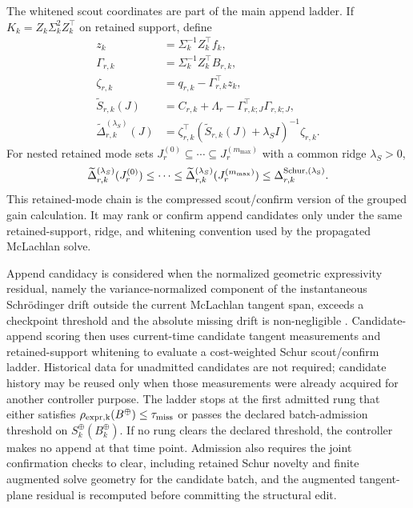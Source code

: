 \documentclass[
  reprint,
  amsmath,
  amssymb,
  aps,
  pra,
  nofootinbib,
  superscriptaddress,
  floatfix
]{revtex4-2}
\newcommand{\placeholder}[1]{\textcolor{red!70!black}{\ifmmode\left[#1\right]\else\textsf{[#1]}\fi}}
\begin{document}
The whitened scout coordinates are part of the main append ladder.  If $K_k=Z_k\Sigma_k^2Z_k^\top$ on retained support, define
\begin{equation}
\begin{aligned}
z_k&=\Sigma_k^{-1}Z_k^\top f_k,\\
\Gamma_{r,k}&=\Sigma_k^{-1}Z_k^\top B_{r,k},\\
\zeta_{r,k}&=q_{r,k}-\Gamma_{r,k}^{\top}z_k,\\
\widetilde S_{r,k}(J)&=C_{r,k}+\Lambda_r-\Gamma_{r,k;J}^{\top}\Gamma_{r,k;J},\\
\widetilde\Delta_{r,k}^{(\lambda_S)}(J)
&=\zeta_{r,k}^{\top}(\widetilde S_{r,k}(J)+\lambda_SI)^{-1}\zeta_{r,k}.
\end{aligned}
\label{eq:whitened_append}
\end{equation}
For nested retained mode sets $J_r^{(0)}\subseteq\cdots\subseteq J_r^{(m_{\max})}$ with a common ridge $\lambda_S>0$,
\begin{equation}
\widetilde\Delta_{r,k}^{(\lambda_S)}(J_r^{(0)})
\le\cdots\le
\widetilde\Delta_{r,k}^{(\lambda_S)}(J_r^{(m_{\max})})
\le
\Delta_{r,k}^{\rm Schur,(\lambda_S)} .
\label{eq:compressed_schur_chain}
\end{equation}
This retained-mode chain is the compressed scout/confirm version of the grouped gain calculation.  It may rank or confirm append candidates only under the same retained-support, ridge, and whitening convention used by the propagated McLachlan solve.

Append candidacy is considered when the normalized geometric expressivity residual, namely the variance-normalized component of the instantaneous Schrödinger drift outside the current McLachlan tangent span, exceeds a checkpoint threshold and the absolute missing drift is non-negligible \cite{Yao2021,Linteau2024,Zhang2025}. %
Candidate-append scoring then uses current-time candidate tangent measurements and retained-support whitening to evaluate a cost-weighted Schur scout/confirm ladder. Historical data for unadmitted candidates are not required; candidate history may be reused only when those measurements were already acquired for another controller purpose.  The ladder stops at the first admitted rung that either satisfies $\rho_{\rm expr,k}(B^{\oplus})\le\tau_{\rm miss}$ or passes the declared batch-admission threshold on \(S_k^{\oplus}(B_k^{\oplus})\).  If no rung clears the declared threshold, the controller makes no append at that time point. Admission also requires the joint confirmation checks to clear, including retained Schur novelty and finite augmented solve geometry for the candidate batch, and the augmented tangent-plane residual is recomputed before committing the structural edit.
\end{document}
